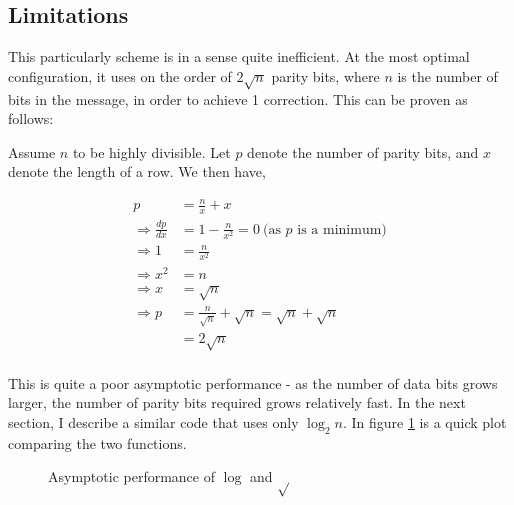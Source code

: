 \documentclass[a4paper,11pt]{article}
\begin{document}
    \subsection{Limitations}

    This particularly scheme is in a sense quite inefficient. At the
    most optimal configuration, it uses on the order of $2\sqrt{n}$ parity bits,
    where $n$ is the number of bits in the message, in order to achieve 1
    correction. This can be proven as follows:

    Assume $n$ to be highly divisible. Let $p$ denote the number of parity
    bits, and $x$ denote the length of a row. We then have,

    \begin{align*}
        p &= \frac{n}{x} + x \\
        \Rightarrow \frac{dp}{dx} &= 1 - \frac{n}{x^2}
                    = 0\ \text{(as $p$ is a minimum)}\\
        \Rightarrow 1 &= \frac{n}{x^2} \\
        \Rightarrow x^2 &= n \\
        \Rightarrow x &= \sqrt{n} \\
        \Rightarrow p &= \frac{n}{\sqrt{n}} + \sqrt{n} = \sqrt{n} + \sqrt{n} \\
                      &= 2\sqrt{n} \\
    \end{align*}

    This is quite a poor asymptotic performance - as the number of data bits
    grows larger, the number of parity bits required grows relatively fast. In
    the next section, I describe a similar code that uses only $\log_2 n$. In
    figure \ref{fig:logsqrtplot} is a quick plot comparing the two functions.

\begin{figure}[H]
\begin{center}
\end{center}
\caption{Asymptotic performance of $\log$ and $\sqrt{}$}\label{fig:logsqrtplot}
\end{figure}
\end{document}
